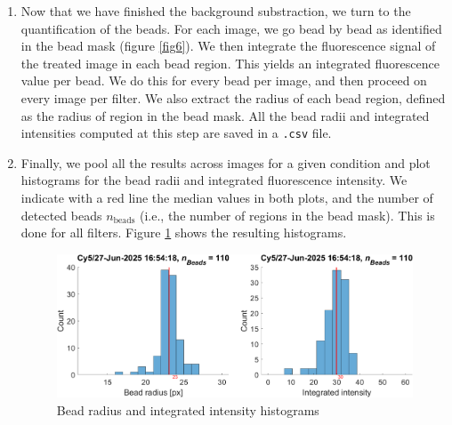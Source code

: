 \documentclass[a4paper]{article}
\begin{document}
\begin{enumerate}
    \item Now that we have finished the background substraction, we turn to the quantification of the beads. For each image, we go bead by bead as identified in the bead mask (figure \ref{fig6}). We then integrate the fluorescence signal of the treated image in each bead region. This yields an integrated fluorescence value per bead. We do this for every bead per image, and then proceed on every image per filter. We also extract the radius of each bead region, defined as the radius of region in the bead mask. All the bead radii and integrated intensities computed at this step are saved in a \verb|.csv| file.
    \item Finally, we pool all the results across images for a given condition and plot histograms for the bead radii and integrated fluorescence intensity. We indicate with a red line the median values in both plots, and the number of detected beads $n_\text{beads}$ (i.e., the number of regions in the bead mask). This is done for all filters. Figure \ref{fig12} shows the resulting histograms.
    
    \begin{figure}[H]
            \center
            \includegraphics[scale=0.8]{fig12.png}
            \caption{Bead radius and integrated intensity histograms}
            \label{fig12}
    \end{figure}

\end{enumerate}
\end{document}
